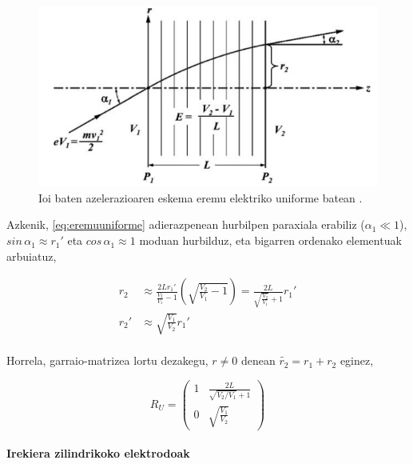 \documentclass[12pt]{article}
\numberwithin{figure}{section}
\numberwithin{equation}{section}
\begin{document}
\begin{figure}[h]
    \centering
    \includegraphics[width=0.9\linewidth]{2 - Oinarri teorikoa/eremuuniforme.png}
    \caption{Ioi baten azelerazioaren eskema eremu elektriko uniforme batean \cite{liebl_applied_2008}.}
    \vspace{-15pt}
    \label{fig:euniforme}
\end{figure}

Azkenik, \eqref{eq:eremuuniforme} adierazpenean hurbilpen paraxiala erabiliz ($\alpha_1\ll1$), $sin\, \alpha_1 \approx r_1'$ eta $cos\, \alpha_1 \approx 1$ moduan hurbilduz, eta bigarren ordenako elementuak arbuiatuz,

\begin{equation}
    \begin{aligned}
        r_2 &\approx \frac{2Lr_1'}{\frac{V_2}{V_1}-1}(\sqrt{\frac{V_2}{V_1}-1}) =\frac{2L}{\sqrt{\frac{V_2}{V_1}}+1} r_1'\\
        r_2' &\approx \sqrt{\frac{V_1}{V_2}}r_1'
    \end{aligned}
\end{equation}\\

Horrela, garraio-matrizea lortu dezakegu, $r\neq 0$ denean $\tilde{r_2}=r_1+r_2$ eginez,

\begin{equation}
\boxed{
    R_U = \begin{pmatrix}
            1 & \frac{2L}{\sqrt{V_2/V_1}+1}\\
            0 & \sqrt{\frac{V_1}{V_2}}
    \end{pmatrix}
}
\end{equation}

\paragraph{Irekiera zilindrikoko elektrodoak}\leavevmode\\
\end{document}
